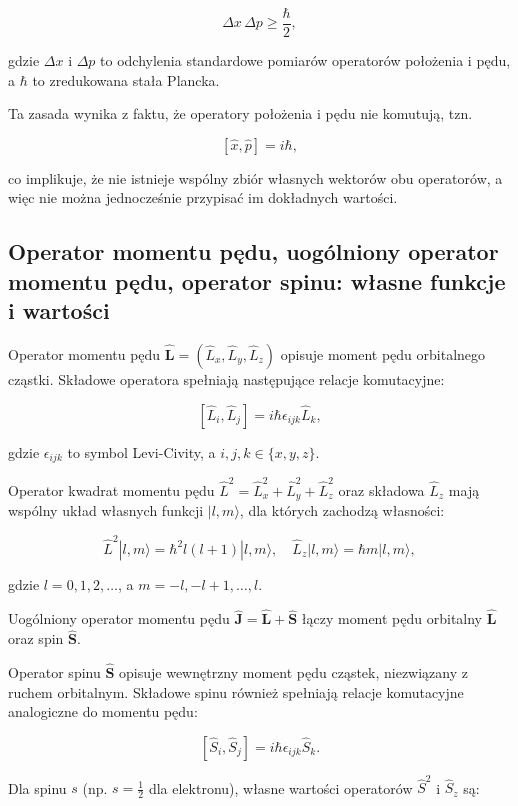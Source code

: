 \[
\Delta x \, \Delta p \geq \frac{\hbar}{2},
\]

gdzie \( \Delta x \) i \( \Delta p \) to odchylenia standardowe pomiarów operatorów położenia i pędu, a \( \hbar \) to zredukowana stała Plancka.

Ta zasada wynika z faktu, że operatory położenia i pędu nie komutują, tzn.

\[
[\hat{x}, \hat{p}] = i \hbar,
\]

co implikuje, że nie istnieje wspólny zbiór własnych wektorów obu operatorów, a więc nie można jednocześnie przypisać im dokładnych wartości.

\subsection{Operator momentu pędu, uogólniony operator momentu pędu, operator spinu: własne funkcje i wartości}


Operator momentu pędu \(\hat{\mathbf{L}} = (\hat{L}_x, \hat{L}_y, \hat{L}_z)\) opisuje moment pędu orbitalnego cząstki. Składowe operatora spełniają następujące relacje komutacyjne:

\[
[\hat{L}_i, \hat{L}_j] = i \hbar \epsilon_{ijk} \hat{L}_k,
\]

gdzie \(\epsilon_{ijk}\) to symbol Levi-Civity, a \(i, j, k \in \{x,y,z\}\).

Operator kwadrat momentu pędu \(\hat{L}^2 = \hat{L}_x^2 + \hat{L}_y^2 + \hat{L}_z^2\) oraz składowa \(\hat{L}_z\) mają wspólny układ własnych funkcji \(|l, m\rangle\), dla których zachodzą własności:

\[
\hat{L}^2 |l, m\rangle = \hbar^2 l(l+1) |l, m\rangle, \quad \hat{L}_z |l, m\rangle = \hbar m |l, m\rangle,
\]

gdzie \(l = 0, 1, 2, \ldots\), a \(m = -l, -l+1, \ldots, l\).

Uogólniony operator momentu pędu \(\hat{\mathbf{J}} = \hat{\mathbf{L}} + \hat{\mathbf{S}}\) łączy moment pędu orbitalny \(\hat{\mathbf{L}}\) oraz spin \(\hat{\mathbf{S}}\).

Operator spinu \(\hat{\mathbf{S}}\) opisuje wewnętrzny moment pędu cząstek, niezwiązany z ruchem orbitalnym. Składowe spinu również spełniają relacje komutacyjne analogiczne do momentu pędu:

\[
[\hat{S}_i, \hat{S}_j] = i \hbar \epsilon_{ijk} \hat{S}_k.
\]

Dla spinu \(s\) (np. \(s = \frac{1}{2}\) dla elektronu), własne wartości operatorów \(\hat{S}^2\) i \(\hat{S}_z\) są:


